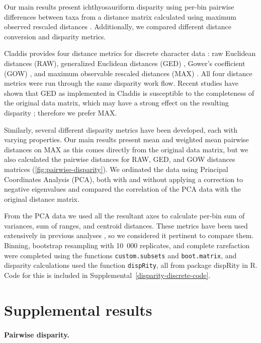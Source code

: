 \documentclass[british,a4paper]{article}
\newcommand\pcref[1]{(\cref{#1})}
\begin{document}
Our main results present ichthyosauriform disparity using per-bin pairwise differences between taxa from a distance matrix calculated using maximum observed rescaled distances \autocite{Lloyd2016}. Additionally, we compared different distance conversion and disparity metrics.

Claddis provides four distance metrics for discrete character data \autocite{Lloyd2016}: raw Euclidean distances (RAW), generalized Euclidean distances (GED) \autocite{Wills1994}, Gower's coefficient (GOW) \autocite{Gower1971}, and maximum observable rescaled distances (MAX) \autocite{Lloyd2016}. All four distance metrics were run through the same disparity work flow. Recent studies have shown that GED as implemented in Claddis is susceptible to the completeness of the original data matrix, which may have a strong effect on the resulting disparity \autocite{Flannery-Sutherland2019, Lehmann2019}; therefore we prefer MAX.

Similarly, several different disparity metrics have been developed, each with varying properties. Our main results present mean and weighted mean pairwise distances on MAX as this comes directly from the original data matrix, but we also calculated the pairwise distances for RAW, GED, and GOW distances matrices \pcref{fig:pairwise-disparity}. We ordinated the data using Principal Coordinates Analysis (PCA), both with and without applying a correction to negative eigenvalues \autocite{Caillez1983} and compared the correlation of the PCA data with the original distance matrix. 

From the PCA data we used all the resultant axes to calculate per-bin sum of variances, sum of ranges, and centroid distances. These metrics have been used extensively in previous analyses \autocite{Wills1998, Thorne2011, Flannery-Sutherland2019}, so we considered it pertinent to compare them. Binning, bootstrap resampling with 10~000 replicates, and complete rarefaction were completed using the functions \texttt{custom.subsets} and \texttt{boot.matrix}, and disparity calculations used the function \texttt{dispRity}, all from package dispRity \autocite{Guillerme2018b} in R. Code for this is included in Supplemental~\ref{disparity-discrete-code}.


\section{Supplemental results}\label{sec:supplemental-results}

\paragraph{Pairwise disparity.}\label{par:pairwise-disparity}
\end{document}
